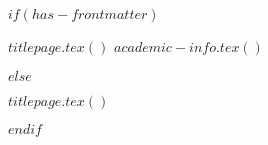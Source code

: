 $if(has-frontmatter)$
  \begin{frontmatter}
  \begin{titlepage}
  $titlepage.tex()$
  \newpage
  $academic-info.tex()$
  
  \end{titlepage}
  \end{frontmatter}
$else$
  \begin{titlepage}
  $titlepage.tex()$
  
  \end{titlepage}
$endif$

  
